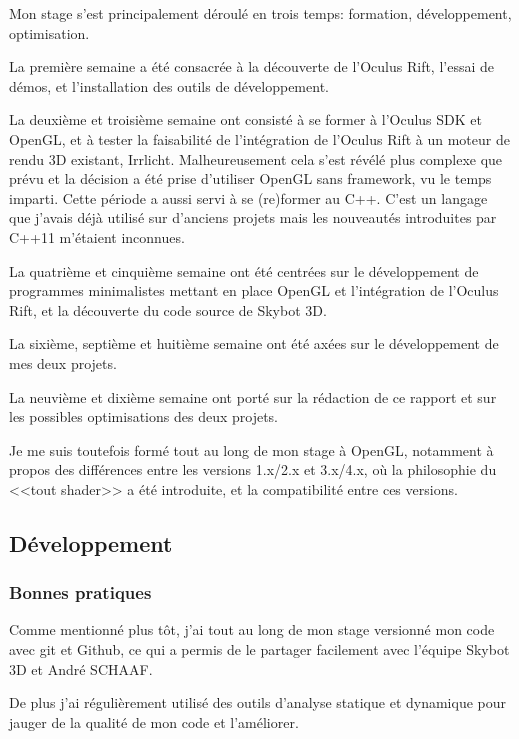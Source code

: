\documentclass[a4paper,french,12pt]{article}
\begin{document}
		Mon stage s'est principalement déroulé en trois temps: formation, développement, optimisation.
		
		La première semaine a été consacrée à la découverte de l'Oculus Rift, l'essai de démos, et l'installation
		des outils de développement.
		
		La deuxième et troisième semaine ont consisté à se former à l'Oculus SDK et OpenGL, et à tester la
		faisabilité de l'intégration de l'Oculus Rift à un moteur de rendu 3D existant, Irrlicht. Malheureusement 
		cela s'est révélé plus complexe que prévu et la décision a été prise d'utiliser OpenGL sans framework,
		vu le temps imparti.
		Cette période a aussi servi à se (re)former au C++. C'est un langage que j'avais déjà utilisé sur d'anciens
		projets mais les nouveautés introduites par C++11 m'étaient inconnues.
		
		La quatrième et cinquième semaine ont été centrées sur le développement de programmes minimalistes mettant
		en place OpenGL et l'intégration de l'Oculus Rift, et la découverte du code source de Skybot 3D.
		
		La sixième, septième et huitième semaine ont été axées sur le développement de mes deux projets.
		
		La neuvième et dixième semaine ont porté sur la rédaction de ce rapport et sur les possibles optimisations
		des deux projets.
				
		Je me suis toutefois formé tout au long de mon stage à OpenGL, notamment à propos
		des différences entre les versions 1.x/2.x et 3.x/4.x, où la philosophie du <<tout shader>> a été introduite,
		et la compatibilité entre ces versions.
		
		
	
	\subsection{Développement}
	
	  \subsubsection{Bonnes pratiques}
	    Comme mentionné plus tôt, j'ai tout au long de mon stage versionné mon code avec git et Github, ce qui a
	    permis de le partager facilement avec l'équipe Skybot 3D et André SCHAAF.
	    
	    De plus j'ai régulièrement utilisé des outils d'analyse statique et dynamique pour jauger de la qualité de
	    mon code et l'améliorer.
	    
\end{document}
